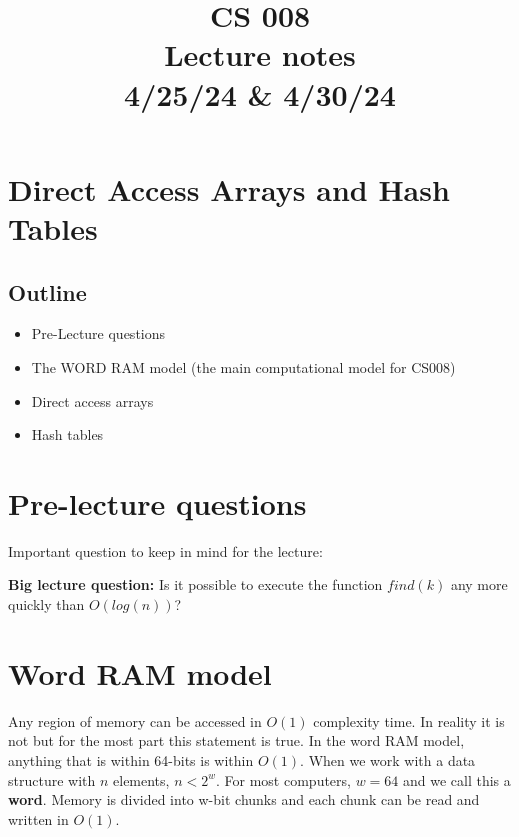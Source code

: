 \documentclass[11pt,a4paper,english]{paper}
\begin{document}
\title{CS 008 \\ Lecture notes \\ 4/25/24 \& 4/30/24}
\maketitle

\section{Direct Access Arrays and Hash Tables}

\subsection{Outline}

\begin{itemize}

  \item Pre-Lecture questions
  \item The WORD RAM model (the main computational model for CS008)
  \item Direct access arrays
  \item Hash tables

\end{itemize}


\section{Pre-lecture questions}

Important question to keep in mind for the lecture:
\noindent 

\bigskip
\begin{gbox}{}{
\noindent \textbf{Big lecture question:} Is it possible to execute the function $find(k)$ any more quickly than $O(log(n))$?
}\end{gbox}

\section{Word RAM model}

Any region of memory can be accessed in $O(1)$ complexity time. In reality it is not but for the most part this statement is true. In the word RAM model, anything that is within 64-bits is within $O(1)$. When we work with a data structure with $n$ elements, $n < 2^{w}$. For most computers, $w = 64$ and we call this a \textbf{word}. Memory is divided into w-bit chunks and each chunk can be read and written in $O(1)$.
\end{document}
